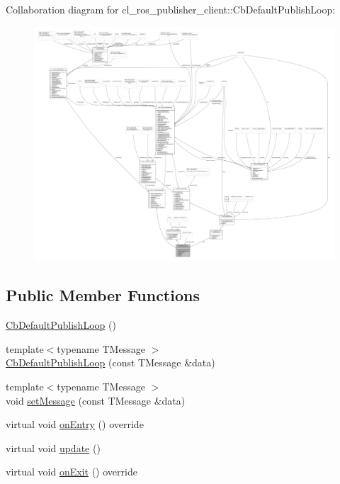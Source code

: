 Collaboration diagram for cl\+\_\+ros\+\_\+publisher\+\_\+client\+:\+:Cb\+Default\+Publish\+Loop\+:
\nopagebreak
\begin{figure}[H]
\begin{center}
\leavevmode
\includegraphics[width=350pt]{classcl__ros__publisher__client_1_1CbDefaultPublishLoop__coll__graph}
\end{center}
\end{figure}
\subsection*{Public Member Functions}
\begin{DoxyCompactItemize}
\item 
\hyperlink{classcl__ros__publisher__client_1_1CbDefaultPublishLoop_a21226873128316e042d678d2c64ce66e}{Cb\+Default\+Publish\+Loop} ()
\item 
{\footnotesize template$<$typename T\+Message $>$ }\\\hyperlink{classcl__ros__publisher__client_1_1CbDefaultPublishLoop_a9e42023a4b86978d0777b66f48495ea7}{Cb\+Default\+Publish\+Loop} (const T\+Message \&data)
\item 
{\footnotesize template$<$typename T\+Message $>$ }\\void \hyperlink{classcl__ros__publisher__client_1_1CbDefaultPublishLoop_ac1199252771fdf4cb62c071cff38a03b}{set\+Message} (const T\+Message \&data)
\item 
virtual void \hyperlink{classcl__ros__publisher__client_1_1CbDefaultPublishLoop_a6a3dc443f683c60961b903b7df248b26}{on\+Entry} () override
\item 
virtual void \hyperlink{classcl__ros__publisher__client_1_1CbDefaultPublishLoop_a3837f0b9471596f15dcd4499c6fdb144}{update} ()
\item 
virtual void \hyperlink{classcl__ros__publisher__client_1_1CbDefaultPublishLoop_a0c580c49d70622286c0e8783f4a4f854}{on\+Exit} () override
\end{DoxyCompactItemize}
